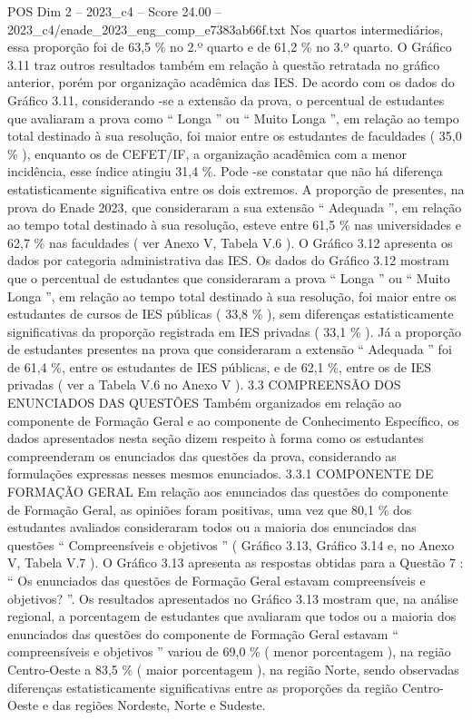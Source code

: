 \begin{textsample}{POS Dim 2 – 2023\_c4 – Score 24.00 – 2023\_c4/enade\_2023\_eng\_comp\_e7383ab66f.txt}
Nos quartos intermediários, essa proporção foi de 63,5 \% no 2.º quarto e de 61,2 \% no 3.º quarto.
O Gráfico 3.11 traz outros resultados também em relação à questão retratada no gráfico anterior, porém por organização acadêmica das IES.
De acordo com os dados do Gráfico 3.11, considerando -se a extensão da prova, o percentual de estudantes que avaliaram a prova como “ Longa ” ou “ Muito Longa ”, em relação ao tempo total destinado à sua resolução, foi maior entre os estudantes de faculdades ( 35,0 \% ), enquanto os de CEFET/IF, a organização acadêmica com a menor incidência, esse índice atingiu 31,4 \%.
Pode -se constatar que não há diferença estatisticamente significativa entre os dois extremos.
A proporção de presentes, na prova do Enade 2023, que consideraram a sua extensão “ Adequada ”, em relação ao tempo total destinado à sua resolução, esteve entre 61,5 \% nas universidades e 62,7 \% nas faculdades ( ver Anexo V, Tabela V.6 ).
O Gráfico 3.12 apresenta os dados por categoria administrativa das IES.
Os dados do Gráfico 3.12 mostram que o percentual de estudantes que consideraram a prova “ Longa ” ou “ Muito Longa ”, em relação ao tempo total destinado à sua resolução, foi maior entre os estudantes de cursos de IES públicas ( 33,8 \% ), sem diferenças estatisticamente significativas da proporção registrada em IES privadas ( 33,1 \% ).
Já a proporção de estudantes presentes na prova que consideraram a extensão “ Adequada ” foi de 61,4 \%, entre os estudantes de IES públicas, e de 62,1 \%, entre os de IES privadas ( ver a Tabela V.6 no Anexo V ). 3.3 COMPREENSÃO DOS ENUNCIADOS DAS QUESTÕES Também organizados em relação ao componente de Formação Geral e ao componente de Conhecimento Específico, os dados apresentados nesta seção dizem respeito à forma como os estudantes compreenderam os enunciados das questões da prova, considerando as formulações expressas nesses mesmos enunciados. 3.3.1 COMPONENTE DE FORMAÇÃO GERAL Em relação aos enunciados das questões do componente de Formação Geral, as opiniões foram positivas, uma vez que 80,1 \% dos estudantes avaliados consideraram todos ou a maioria dos enunciados das questões “ Compreensíveis e objetivos ” ( Gráfico 3.13, Gráfico 3.14 e, no Anexo V, Tabela V.7 ).
O Gráfico 3.13 apresenta as respostas obtidas para a Questão 7 : “ Os enunciados das questões de Formação Geral estavam compreensíveis e objetivos? ”.
Os resultados apresentados no Gráfico 3.13 mostram que, na análise regional, a porcentagem de estudantes que avaliaram que todos ou a maioria dos enunciados das questões do componente de Formação Geral estavam “ compreensíveis e objetivos ” variou de 69,0 \% ( menor porcentagem ), na região Centro-Oeste a 83,5 \% ( maior porcentagem ), na região Norte, sendo observadas diferenças estatisticamente significativas entre as proporções da região Centro-Oeste e das regiões Nordeste, Norte e Sudeste.

\end{textsample}
